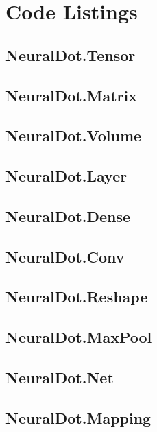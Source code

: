 \chapter{Code Listings}

\section{NeuralDot.Tensor}

\section{NeuralDot.Matrix}

\section{NeuralDot.Volume}


\section{NeuralDot.Layer}

\section{NeuralDot.Dense}

\section{NeuralDot.Conv}

\section{NeuralDot.Reshape}

\section{NeuralDot.MaxPool}


\section{NeuralDot.Net}

\section{NeuralDot.Mapping}

